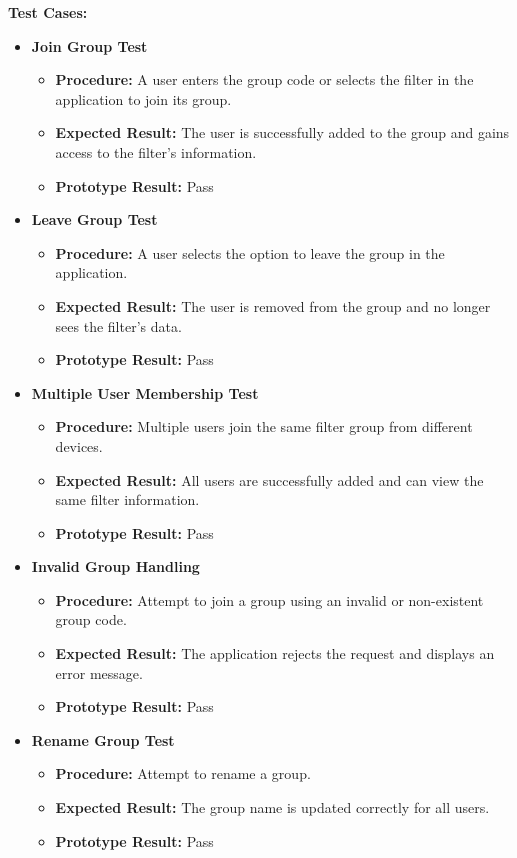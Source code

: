 \noindent{}\textbf{Test Cases:}
\begin{itemize}
\setlength{\itemsep}{0pt}
\setlength{\parskip}{0pt}
\setlength{\parsep}{0pt}
\setlength{\topsep}{0pt}

\item \textbf{Join Group Test}
\begin{itemize}
\item \textbf{Procedure:} A user enters the group code or selects the filter in the application to join its group.
\item \textbf{Expected Result:} The user is successfully added to the group and gains access to the filter’s information.
\item \textbf{Prototype Result:} Pass
\end{itemize}

\item \textbf{Leave Group Test}
\begin{itemize}
\item \textbf{Procedure:} A user selects the option to leave the group in the application.
\item \textbf{Expected Result:} The user is removed from the group and no longer sees the filter’s data.
\item \textbf{Prototype Result:} Pass
\end{itemize}

\item \textbf{Multiple User Membership Test}
\begin{itemize}
\item \textbf{Procedure:} Multiple users join the same filter group from different devices.
\item \textbf{Expected Result:} All users are successfully added and can view the same filter information.
\item \textbf{Prototype Result:} Pass
\end{itemize}

\item \textbf{Invalid Group Handling}
\begin{itemize}
\item \textbf{Procedure:} Attempt to join a group using an invalid or non-existent group code.
\item \textbf{Expected Result:} The application rejects the request and displays an error message.
\item \textbf{Prototype Result:} Pass
\end{itemize}

\item \textbf{Rename Group Test}
\begin{itemize}
\item \textbf{Procedure:} Attempt to rename a group.
\item \textbf{Expected Result:} The group name is updated correctly for all users.
\item \textbf{Prototype Result:} Pass
\end{itemize}


\end{itemize}
